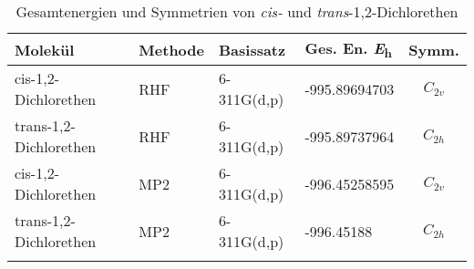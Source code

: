 \documentclass[12pt]{article}
\begin{document}
\begin{onehalfspace}
\begin{table}[!htpb]
\caption{Gesamtenergien und Symmetrien von \textit{cis-} und \textit{trans}-1,2-Dichlorethen}
\begin{tabular}{llllc}
\toprule
Molekül & Methode &   Basissatz & Ges. En. \si{\hartree} & Symm. \\
\midrule
cis-1,2-Dichlorethen   & RHF& 6-311G(d,p)& -995.89694703 &$C_ {2v}$  \\
trans-1,2-Dichlorethen & RHF& 6-311G(d,p)& -995.89737964 &$C_ {2h}$ \\
cis-1,2-Dichlorethen   & MP2& 6-311G(d,p)& -996.45258595  &$C_ {2v}$  \\
trans-1,2-Dichlorethen & MP2& 6-311G(d,p)& -996.45188 &$C_ {2h}$    \\
\bottomrule
\label{table:energie}
\end{tabular}
\end{table}







\end{onehalfspace}
\end{document}
